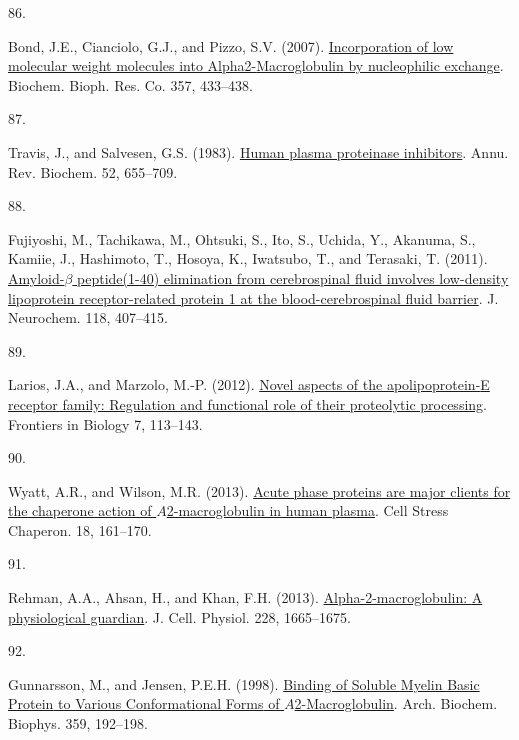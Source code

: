 \documentclass[
]{article}
\newlength{\cslhangindent}
\newlength{\csllabelwidth}
\newlength{\cslentryspacingunit} %
\newenvironment{CSLReferences}[2] %
 {%
  \setlength{\parindent}{0pt}
  \ifodd #1
  \let\oldpar\par
  \def\par{\hangindent=\cslhangindent\oldpar}
  \fi
  \setlength{\parskip}{#2\cslentryspacingunit}
 }%
 {}
\newcommand{\CSLLeftMargin}[1]{\parbox[t]{\csllabelwidth}{#1}}
\newcommand{\CSLRightInline}[1]{\parbox[t]{\linewidth - \csllabelwidth}{#1}\break}
\begin{document}
\begin{CSLReferences}{0}{0}
\leavevmode{}%
\CSLLeftMargin{86. }
\CSLRightInline{Bond, J.E., Cianciolo, G.J., and Pizzo, S.V. (2007). \href{https://doi.org/10.1016/j.bbrc.2007.03.151}{Incorporation of low molecular weight molecules into Alpha2-{Macroglobulin} by nucleophilic exchange}. Biochem. Bioph. Res. Co. 357, 433--438.}

\leavevmode{}%
\CSLLeftMargin{87. }
\CSLRightInline{Travis, J., and Salvesen, G.S. (1983). \href{https://doi.org/10.1146/annurev.bi.52.070183.003255}{Human plasma proteinase inhibitors}. Annu. Rev. Biochem. 52, 655--709.}

\leavevmode{}%
\CSLLeftMargin{88. }
\CSLRightInline{Fujiyoshi, M., Tachikawa, M., Ohtsuki, S., Ito, S., Uchida, Y., Akanuma, S., Kamiie, J., Hashimoto, T., Hosoya, K., Iwatsubo, T., and Terasaki, T. (2011). \href{https://doi.org/10.1111/j.1471-4159.2011.07311.x}{Amyloid-{\(\beta\)} peptide(1-40) elimination from cerebrospinal fluid involves low-density lipoprotein receptor-related protein 1 at the blood-cerebrospinal fluid barrier}. J. Neurochem. 118, 407--415.}

\leavevmode{}%
\CSLLeftMargin{89. }
\CSLRightInline{Larios, J.A., and Marzolo, M.-P. (2012). \href{https://doi.org/10.1007/s11515-011-1186-7}{Novel aspects of the apolipoprotein-{E} receptor family: Regulation and functional role of their proteolytic processing}. Frontiers in Biology 7, 113--143.}

\leavevmode{}%
\CSLLeftMargin{90. }
\CSLRightInline{Wyatt, A.R., and Wilson, M.R. (2013). \href{https://doi.org/10.1007/s12192-012-0365-z}{Acute phase proteins are major clients for the chaperone action of {\(A\)}2-macroglobulin in human plasma}. Cell Stress Chaperon. 18, 161--170.}

\leavevmode{}%
\CSLLeftMargin{91. }
\CSLRightInline{Rehman, A.A., Ahsan, H., and Khan, F.H. (2013). \href{https://doi.org/10.1002/jcp.24266}{Alpha-2-macroglobulin: {A} physiological guardian}. J. Cell. Physiol. 228, 1665--1675.}

\leavevmode{}%
\CSLLeftMargin{92. }
\CSLRightInline{Gunnarsson, M., and Jensen, P.E.H. (1998). \href{https://doi.org/10.1006/abbi.1998.0902}{Binding of {Soluble Myelin Basic Protein} to {Various Conformational Forms} of {\(A\)}2-{Macroglobulin}}. Arch. Biochem. Biophys. 359, 192--198.}


\end{CSLReferences}
\end{document}
